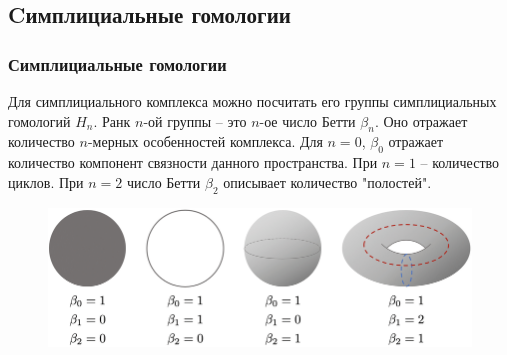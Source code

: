 \documentclass{beamer}
\begin{document}
		\subsection{Cимплициальные гомологии}
		\begin{frame}[fragile]
			\frametitle{Симплициальные гомологии}
			Для симплициального комплекса можно посчитать его группы симплициальных гомологий $H_n$. Ранк $n$-ой группы -- это $n$-ое число Бетти $\beta_n$. Оно отражает количество $n$-мерных особенностей комплекса. Для $n=0$, $\beta_0$ отражает количество компонент связности данного пространства. При $n=1$ -- количество циклов. При $n=2$ число Бетти $\beta_2$ описывает количество "полостей".
			
			\begin{figure}[!htbp]
				\centering
				\includegraphics[width=0.5\linewidth, keepaspectratio=true]{betti_numbers.png}
			\end{figure}
		\end{frame}

		
\end{document}
